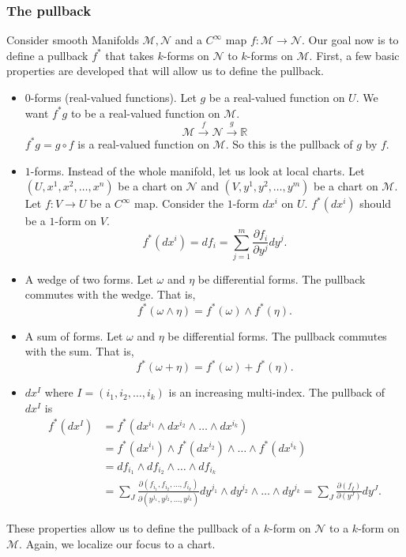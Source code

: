 \documentclass{article}
\theoremstyle{definition}
\theoremstyle{named}
\begin{document}
\subsubsection{The pullback}
Consider smooth Manifolds $\mathcal{M},\mathcal{N}$ and a $C^\infty$ map $f:\mathcal{M} \to \mathcal{N}$. Our goal now is to define a pullback $f^*$ that takes $k$-forms on $\mathcal{N}$ to $k$-forms on $\mathcal{M}$. First, a few basic properties are developed that will allow us to define the pullback.
\begin{itemize}
    \item $0$-forms (real-valued functions). Let $g$ be a real-valued function on $U$. We want $f^*g$ to be a real-valued function on $\mathcal{M}$. 
    \[
        \mathcal{M} \xrightarrow{f} \mathcal{N} \xrightarrow{g} \mathbb{R}
    \]
    $f^*g = g \circ f$ is a real-valued function on $\mathcal{M}$. So this is the pullback of $g$ by $f$.
    \item $1$-forms. Instead of the whole manifold, let us look at local charts. Let $(U, x^1, x^2, \ldots, x^n)$ be a chart on $\mathcal{N}$ and $(V, y^1, y^2, \ldots, y^m)$ be a chart on $\mathcal{M}$. Let $f: V \to U$ be a $C^\infty$ map. Consider the $1$-form $dx^i$ on $U$. $f^*(dx^i)$ should be a $1$-form on $V$. 
    \[
        f^*(dx^i) = df_i = \sum_{j=1}^m \frac{\partial f_i}{\partial y^j} dy^j.
    \]
    \item A wedge of two forms. Let $\omega$ and $\eta$ be differential forms. The pullback commutes with the wedge. That is,
    \[
        f^*(\omega \wedge \eta) = f^*(\omega) \wedge f^*(\eta).
    \]
    \item A sum of forms. Let $\omega$ and $\eta$ be differential forms. The pullback commutes with the sum. That is,
    \[
        f^*(\omega + \eta) = f^*(\omega) + f^*(\eta).
    \]
    \item $dx^I$ where $I = (i_1, i_2, \ldots, i_k)$ is an increasing multi-index. The pullback of $dx^I$ is
    \begin{align*}
        f^*(dx^I) &= f^*(dx^{i_1} \wedge dx^{i_2} \wedge \ldots \wedge dx^{i_k})\\
        &= f^*(dx^{i_1}) \wedge f^*(dx^{i_2}) \wedge \ldots \wedge f^*(dx^{i_k})\\
        &= df_{i_1} \wedge df_{i_2} \wedge \ldots \wedge df_{i_k}\\
        &= \sum_{J} \frac{
            \partial(f_{i_1}, f_{i_2}, \ldots, f_{i_k})
        }{
            \partial(y^{j_1}, y^{j_2}, \ldots, y^{j_k})
        } dy^{j_1} \wedge dy^{j_2} \wedge \ldots \wedge dy^{j_k}
        = \sum_{J} \frac{
            \partial(f_{I})
        }{
            \partial(y^{J})
        } dy^{J}.
    \end{align*}
\end{itemize}
These properties allow us to define the pullback of a $k$-form on $\mathcal{N}$ to a $k$-form on $\mathcal{M}$. Again, we localize our focus to a chart. 
\end{document}
